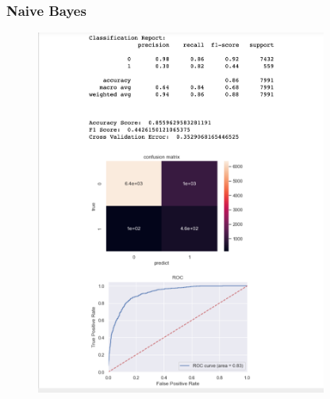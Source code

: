\documentclass{article}
\begin{document}
\subsubsection{Naive Bayes}
\begin{figure}[H]
    \centering
    \includegraphics[width=0.85\textwidth]{Fig5}
\end{figure}
\end{document}
